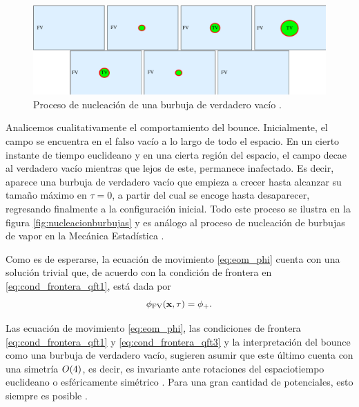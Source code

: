\begin{figure}[t]
	\centering
	\includegraphics[scale=0.4]{FIGURAS/nucleacion_burbujas}
	\caption{Proceso de nucleación de una burbuja de verdadero vacío \cite{Masoumi:2015psa}.}
	\label{fig:nucleacionburbujas}
\end{figure}
Analicemos cualitativamente el comportamiento del bounce. Inicialmente, el campo se encuentra en el falso vacío a lo largo de todo el espacio.
En un cierto instante de tiempo euclideano y en una cierta región del espacio, el campo decae al verdadero vacío mientras que lejos de este, permanece inafectado. Es decir, aparece una burbuja de verdadero vacío 
que empieza a crecer hasta alcanzar su tamaño máximo en $\tau = 0$, a partir del cual se encoge hasta desaparecer, regresando finalmente a la configuración inicial. Todo este proceso se ilustra en la figura \eqref{fig:nucleacionburbujas}
y es análogo al proceso de nucleación de burbujas de vapor en la Mecánica Estadística \cite{coleman1977fate}.

Como es de esperarse, la ecuación de movimiento \eqref{eq:eom_phi} cuenta con una solución trivial que, de acuerdo con la condición de frontera en \eqref{eq:cond_frontera_qft1}, está dada por
\begin{equation} \label{eq:phi_trivial}
	\phi_{\text{FV}}\qty(\vb{x}, \tau) = \phi_+.
\end{equation}

Las ecuación de movimiento \eqref{eq:eom_phi}, las condiciones de frontera \eqref{eq:cond_frontera_qft1} y \eqref{eq:cond_frontera_qft3} y la interpretación del bounce como una burbuja de verdadero vacío, sugieren asumir que este último cuenta con una simetría $O\qty(4)$, es decir, es invariante ante rotaciones del espaciotiempo euclideano o esféricamente simétrico \cite{weinberg2012classical}. Para una gran cantidad de potenciales, esto siempre es posible 
\cite{coleman1978action}. 

